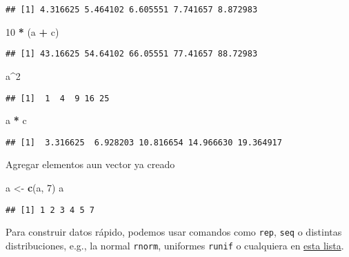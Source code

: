 \documentclass[]{article}
\newenvironment{Shaded}{\begin{snugshade}}{\end{snugshade}}
\newcommand{\KeywordTok}[1]{\textcolor[rgb]{0.13,0.29,0.53}{\textbf{#1}}}
\newcommand{\DecValTok}[1]{\textcolor[rgb]{0.00,0.00,0.81}{#1}}
\newcommand{\StringTok}[1]{\textcolor[rgb]{0.31,0.60,0.02}{#1}}
\newcommand{\OperatorTok}[1]{\textcolor[rgb]{0.81,0.36,0.00}{\textbf{#1}}}
\newcommand{\NormalTok}[1]{#1}
\begin{document}
\begin{verbatim}
## [1] 4.316625 5.464102 6.605551 7.741657 8.872983
\end{verbatim}

\begin{Shaded}
\begin{Highlighting}[]
\DecValTok{10} \OperatorTok{*}\StringTok{ }\NormalTok{(a }\OperatorTok{+}\StringTok{ }\NormalTok{c)}
\end{Highlighting}
\end{Shaded}

\begin{verbatim}
## [1] 43.16625 54.64102 66.05551 77.41657 88.72983
\end{verbatim}

\begin{Shaded}
\begin{Highlighting}[]
\NormalTok{a}\OperatorTok{^}\DecValTok{2}
\end{Highlighting}
\end{Shaded}

\begin{verbatim}
## [1]  1  4  9 16 25
\end{verbatim}

\begin{Shaded}
\begin{Highlighting}[]
\NormalTok{a }\OperatorTok{*}\StringTok{ }\NormalTok{c}
\end{Highlighting}
\end{Shaded}

\begin{verbatim}
## [1]  3.316625  6.928203 10.816654 14.966630 19.364917
\end{verbatim}

Agregar elementos aun vector ya creado

\begin{Shaded}
\begin{Highlighting}[]
\NormalTok{a <-}\StringTok{ }\KeywordTok{c}\NormalTok{(a, }\DecValTok{7}\NormalTok{)}
\NormalTok{a}
\end{Highlighting}
\end{Shaded}

\begin{verbatim}
## [1] 1 2 3 4 5 7
\end{verbatim}

Para construir datos rápido, podemos usar comandos como \texttt{rep},
\texttt{seq} o distintas distribuciones, e.g., la normal \texttt{rnorm},
uniformes \texttt{runif} o cualquiera en
\href{https://stat.ethz.ch/R-manual/R-devel/library/stats/html/Distributions.html}{esta
lista}.
\end{document}
